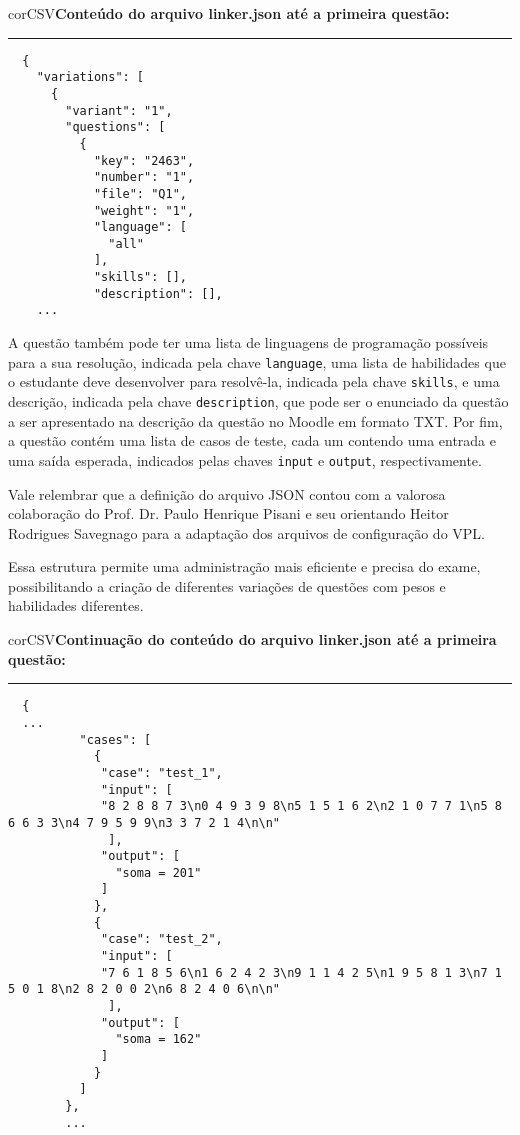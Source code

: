 \begin{myboxCode}{corCSV}{\textbf{Conteúdo do arquivo linker.json até a primeira questão:}}\vspace{3mm}
  \hrule
  {\scriptsize 
  \begin{verbatim}
  {
    "variations": [
      {
        "variant": "1",
        "questions": [
          {
            "key": "2463",
            "number": "1",
            "file": "Q1",
            "weight": "1",
            "language": [
              "all"
            ],
            "skills": [],
            "description": [],
    ...
  \end{verbatim}
  }
  \end{myboxCode}
  
A questão também pode ter uma lista de linguagens de programação possíveis para a sua resolução, indicada pela chave \verb|language|, uma lista de habilidades que o estudante deve desenvolver para resolvê-la, indicada pela chave \verb|skills|, e uma descrição, indicada pela chave \verb|description|, que pode ser o enunciado da questão a ser apresentado na descrição da questão no Moodle em formato TXT. Por fim, a questão contém uma lista de casos de teste, cada um contendo uma entrada e uma saída esperada, indicados pelas chaves \verb|input| e \verb|output|, respectivamente.

Vale relembrar que a definição do arquivo JSON contou com a valorosa colaboração do Prof. Dr. Paulo Henrique Pisani e seu orientando Heitor Rodrigues Savegnago para a
adaptação dos arquivos de configuração do VPL.

Essa estrutura permite uma administração mais eficiente e precisa do exame, possibilitando a criação de diferentes variações de questões com pesos e habilidades diferentes.


\begin{myboxCode}{corCSV}{\textbf{Continuação do conteúdo do arquivo linker.json até a primeira questão:}}\vspace{3mm}
  \hrule
  {\scriptsize 
  \begin{verbatim}
  {
  ...  
          "cases": [
            {
             "case": "test_1",
             "input": [
             "8 2 8 8 7 3\n0 4 9 3 9 8\n5 1 5 1 6 2\n2 1 0 7 7 1\n5 8 6 6 3 3\n4 7 9 5 9 9\n3 3 7 2 1 4\n\n"
              ],
             "output": [
               "soma = 201"
             ]
            },
            {
             "case": "test_2",
             "input": [
             "7 6 1 8 5 6\n1 6 2 4 2 3\n9 1 1 4 2 5\n1 9 5 8 1 3\n7 1 5 0 1 8\n2 8 2 0 0 2\n6 8 2 4 0 6\n\n"
              ],
             "output": [
               "soma = 162"
             ]
            }
          ]
        },
        ...
\end{verbatim}
}
\end{myboxCode}

